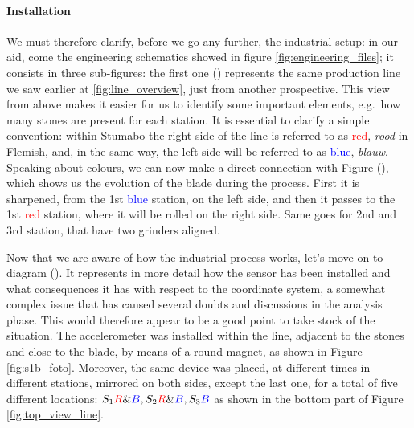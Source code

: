 \paragraph{Installation} We must therefore clarify, before we go any further, the industrial setup: in our aid, come the engineering schematics showed in figure \ref{fig:engineering_files};
it consists in three sub-figures: the first one () represents the same production line we saw earlier at \ref{fig:line_overview}, just from another prospective. 
This view from above makes it easier for us to identify some important elements, e.g.\ how many stones are present for each station.
It is essential to clarify a simple convention: within Stumabo the right side of the line is referred to as \textcolor{red}{red}, \textit{rood} in Flemish, and, in the same way, 
the left side will be referred to as \textcolor{blue}{blue}, \textit{blauw}. 
Speaking about colours, we can now make a direct connection with Figure (), which shows us the evolution of the blade during the process.
First it is sharpened, from the 1st \textcolor{blue}{blue} station, on the left side, and then it passes to the 1st \textcolor{red}{red} station, where it will be rolled on the right side. 
Same goes for 2nd and 3rd station, that have two grinders aligned. 

Now that we are aware of how the industrial process works, let's move on to diagram ().
It represents in more detail how the sensor has been installed and what consequences it has with respect to the coordinate system, 
a somewhat complex issue that has caused several doubts and discussions in the analysis phase. This would therefore appear to be a good point to take stock of the situation.
The accelerometer was installed within the line, adjacent to the stones and close to the blade, by means of a round magnet, as shown in Figure \ref{fig:s1b_foto}.
Moreover, the same device was placed, at different times in different stations, mirrored on both sides, except the last one, for a total of five different locations: 
${S_{1}\textcolor{red}{R}\&\textcolor{blue}{B}, S_{2}\textcolor{red}{R}\&\textcolor{blue}{B}, S_{3}\textcolor{blue}{B}}$ as shown in the bottom part of Figure \ref{fig:top_view_line}.

